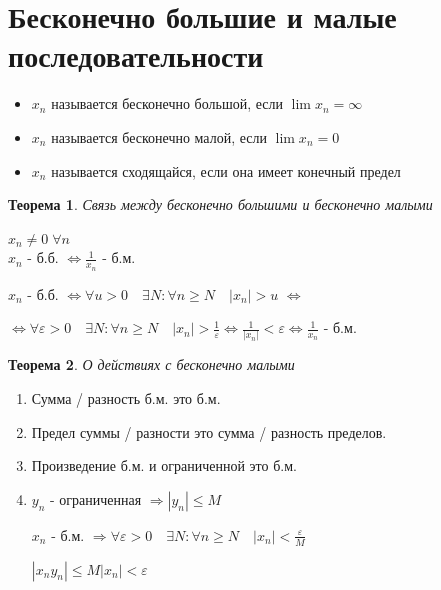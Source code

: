 \documentclass[12pt,letterpaper]{report}
\makeatletter
\newtheorem*{theorem-non}{Теорема}
\theoremstyle{definition}
\renewenvironment{proof}[1][\proofname]{%
   \par\pushQED{\qed}\normalfont%
   \topsep6\p@\@plus6\p@\relax
   \trivlist\item[\hskip\labelsep\bfseries#1\@addpunct{.}]%
   \ignorespaces
}{%
   \popQED\endtrivlist\@endpefalse
}
\makeatother
\begin{document}
    \section{Бесконечно большие и малые последовательности}
    \begin{itemize}
        \item $x_n$ называется бесконечно большой, если $\lim x_n = \infty$
        \item $x_n$ называется бесконечно малой, если $\lim x_n = 0$
        \item $x_n$ называется сходящайся, если она имеет конечный предел
    \end{itemize}
    \vspace{0.7cm}
    \begin{theorem-non} Связь между бесконечно большими и бесконечно малыми\end{theorem-non}
    $x_n \neq 0\; \forall n$ \\
    $x_n$ - б.б. $\Leftrightarrow \frac{1}{x_n}$ - б.м.
    \begin{proof}
        $x_n$ - б.б. $\Leftrightarrow \forall u > 0\quad \exists N : \forall n \geqslant N\quad |x_n| > u$ $\Leftrightarrow$ 
        
        $\Leftrightarrow \forall \varepsilon > 0\quad \exists N : \forall n \geqslant N\quad |x_n| > \frac{1}{\varepsilon} \Leftrightarrow \frac{1}{|x_n|} < \varepsilon \Leftrightarrow \frac{1}{x_n}$ - б.м.
    \end{proof}
    \begin{theorem-non} О действиях с бесконечно малыми \end{theorem-non}
    \begin{enumerate}
        \item Сумма / разность б.м. это б.м.
        \begin{proof}
            Предел суммы / разности это сумма / разность пределов. 
        \end{proof}
        \item Произведение б.м. и ограниченной это б.м.
        \begin{proof}
            $y_n$ - ограниченная $\Rightarrow |y_n| \leqslant M$ 
            
            $x_n$ - б.м. $\Rightarrow \forall \varepsilon > 0\quad \exists N : \forall n \geqslant N\quad |x_n| < \frac{\varepsilon}{M}$
            
            $|x_ny_n| \leqslant M|x_n| < \varepsilon$
        \end{proof}
    \end{enumerate}
    
\end{document}

